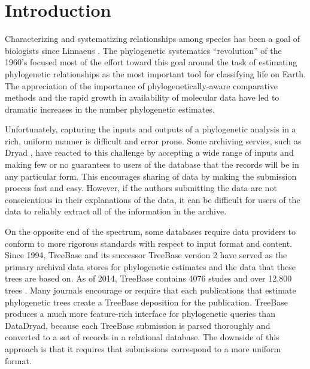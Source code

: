 \documentclass{bioinfo}
\begin{document}
\section{Introduction}

Characterizing and systematizing relationships among species has been a goal of biologists since Linnaeus \cite{Linne1758}.
The phylogenetic systematics ``revolution'' of the 1960's focused most of the effort toward this goal around the 
    task of estimating phylogenetic relationships as the most important tool for classifying life on Earth.
The appreciation of the importance of phylogenetically-aware comparative methods \citep[e.g.][]{Felsenstein1985Comp} and 
the rapid growth in availability of molecular data have led to dramatic increases in the number phylogenetic estimates.


Unfortunately, capturing the inputs and outputs of a phylogenetic analysis in a rich, uniform manner is
    difficult and error prone.
Some archiving servies, such as Dryad \citep{Dryad}, have reacted to this challenge by accepting a 
    wide range of inputs and making few or no
    guarantees to users of the database that the records will be in any particular form.
This encourages sharing of data by making the submission process fast and easy.
However, if the authors submitting the data are not conscientious in their explanations of the data, it can be difficult
    for users of the data to reliably extract all of the information in the archive.

On the opposite end of the spectrum, some databases require data providers to conform to more rigorous
    standards with respect to input format and content.
Since 1994, TreeBase \citep{SandersonDPE1994} and its successor TreeBase version 2 have served
    as the primary archival data stores for phylogenetic estimates and the data that these trees are based on.
As of 2014, TreeBase contains 4076 studes and over 12,800 trees \citep{TreeBaseWebCite}.
Many journals encourage or require that each publications that estimate phylogenetic trees create a TreeBase
    deposition for the publication.
TreeBase produces a much more feature-rich interface for phylogenetic queries than DataDryad, because each 
    TreeBase submission is parsed thoroughly and converted to a set of records in a relational database.
The downside of this approach is that it requires that submissions correspond to a more uniform format.
\end{document}
